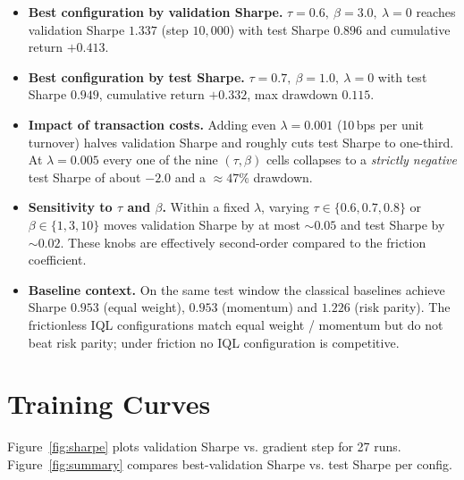 \begin{itemize}[noitemsep, topsep=0pt]
\item \textbf{Best configuration by validation Sharpe.}
      $\tau = 0.6,\ \beta = 3.0,\ \lambda = 0$ reaches validation Sharpe
      $1.337$ (step $10{,}000$) with test Sharpe $0.896$ and
      cumulative return $+0.413$.
\item \textbf{Best configuration by test Sharpe.}
      $\tau = 0.7,\ \beta = 1.0,\ \lambda = 0$ with test Sharpe
      $0.949$, cumulative return $+0.332$, max drawdown $0.115$.
\item \textbf{Impact of transaction costs.}  Adding even
      $\lambda = 0.001$ (10\,bps per unit turnover) halves validation
      Sharpe and roughly cuts test Sharpe to one-third.  At
      $\lambda = 0.005$ every one of the nine $(\tau,\beta)$ cells
      collapses to a \emph{strictly negative} test Sharpe of about
      $-2.0$ and a $\approx 47\%$ drawdown.
\item \textbf{Sensitivity to $\tau$ and $\beta$.}  Within a fixed
      $\lambda$, varying $\tau \in \{0.6,0.7,0.8\}$ or
      $\beta \in \{1,3,10\}$ moves validation Sharpe by at most
      $\sim 0.05$ and test Sharpe by $\sim 0.02$.  These knobs are
      effectively second-order compared to the friction coefficient.
\item \textbf{Baseline context.}  On the same test window the classical
      baselines achieve Sharpe $0.953$ (equal weight), $0.953$
      (momentum) and $1.226$ (risk parity).  The frictionless IQL
      configurations match equal weight / momentum but do not beat
      risk parity; under friction no IQL configuration is competitive.
\end{itemize}

\section{Training Curves}

Figure~\ref{fig:sharpe} plots validation Sharpe vs. gradient step
for 27 runs.  Figure~\ref{fig:summary} compares best-validation
Sharpe vs. test Sharpe per config.

